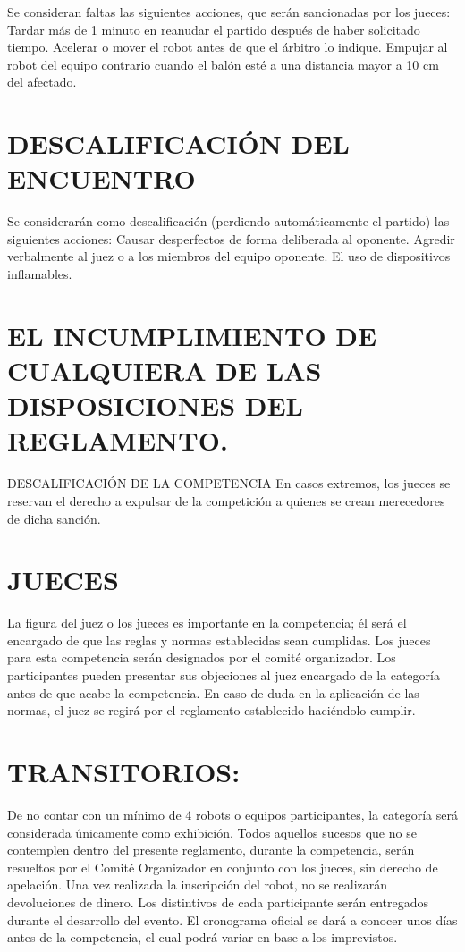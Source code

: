 \documentclass[
  letterpaper,
  DIV=11,
  numbers=noendperiod]{scrreprt}
\begin{document}
Se consideran faltas las siguientes acciones, que serán sancionadas por
los jueces: Tardar más de 1 minuto en reanudar el partido después de
haber solicitado tiempo. Acelerar o mover el robot antes de que el
árbitro lo indique. Empujar al robot del equipo contrario cuando el
balón esté a una distancia mayor a 10 cm del afectado.

\section{DESCALIFICACIÓN DEL
ENCUENTRO}\label{descalificaciuxf3n-del-encuentro}

Se considerarán como descalificación (perdiendo automáticamente el
partido) las siguientes acciones: Causar desperfectos de forma
deliberada al oponente. Agredir verbalmente al juez o a los miembros del
equipo oponente. El uso de dispositivos inflamables.

\section{EL INCUMPLIMIENTO DE CUALQUIERA DE LAS DISPOSICIONES DEL
REGLAMENTO.}\label{el-incumplimiento-de-cualquiera-de-las-disposiciones-del-reglamento.}

DESCALIFICACIÓN DE LA COMPETENCIA En casos extremos, los jueces se
reservan el derecho a expulsar de la competición a quienes se crean
merecedores de dicha sanción.

\section{JUECES}\label{jueces}

La figura del juez o los jueces es importante en la competencia; él será
el encargado de que las reglas y normas establecidas sean cumplidas. Los
jueces para esta competencia serán designados por el comité organizador.
Los participantes pueden presentar sus objeciones al juez encargado de
la categoría antes de que acabe la competencia. En caso de duda en la
aplicación de las normas, el juez se regirá por el reglamento
establecido haciéndolo cumplir.

\section{TRANSITORIOS:}\label{transitorios}

De no contar con un mínimo de 4 robots o equipos participantes, la
categoría será considerada únicamente como exhibición. Todos aquellos
sucesos que no se contemplen dentro del presente reglamento, durante la
competencia, serán resueltos por el Comité Organizador en conjunto con
los jueces, sin derecho de apelación. Una vez realizada la inscripción
del robot, no se realizarán devoluciones de dinero. Los distintivos de
cada participante serán entregados durante el desarrollo del evento. El
cronograma oficial se dará a conocer unos días antes de la competencia,
el cual podrá variar en base a los imprevistos.
\end{document}
